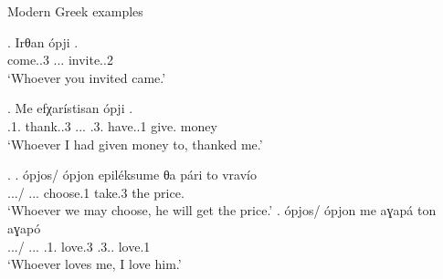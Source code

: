 \begin{frame}[t,noframenumbering]{Modern Greek examples}

  \exg. Irθan ópji .\\
  come..3\scsub{[nom]} ... invite..2\scsub{[acc]}\\
  `Whoever you invited came.'\label{ex:greek-nom-acc}

  \exg. Me efχarístisan ópji    .\\
   .1. thank..3\scsub{[nom]} ... .3. have..1 give.\scsub{[gen]} money\\
   `Whoever I had given money to, thanked me.'\label{ex:greek-nom-gen}

   \ex.
   \ag. ópjos/ ópjon epiléksume θa pári to vravío\\
   .../ ... choose.1\scsub{[acc]}  take.3\scsub{[nom]} the price.\\
   `Whoever we may choose, he will get the price.'
   \bg. ópjos/ ópjon me aɣapá ton aɣapó\\
   .../ ... .1. love.3\scsub{[nom]}
   .3.. love.1\scsub{[acc]}\\
   `Whoever loves me, I love him.' 

\end{frame}

